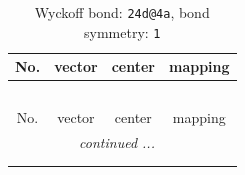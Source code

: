 \documentclass[fleqn,8pt]{jsarticle}
\begin{document}
\renewcommand{\arraystretch}{1.2}
\begin{longtable}{cccc}
\caption{Wyckoff bond: {\tt 24d@4a}, bond symmetry: {\tt 1}}
 \\
 \hline \hline
No. & vector & center & mapping \\ \hline \endfirsthead

\multicolumn{3}{l}{\tablename\ \thetable{}} \\
 \hline \hline
No. & vector & center & mapping \\ \hline \endhead

 \hline \hline
\multicolumn{3}{r}{\footnotesize\it continued ...} \\ \endfoot

 \hline \hline
\multicolumn{3}{r}{} \\ \endlastfoot


\end{longtable}
\end{document}
